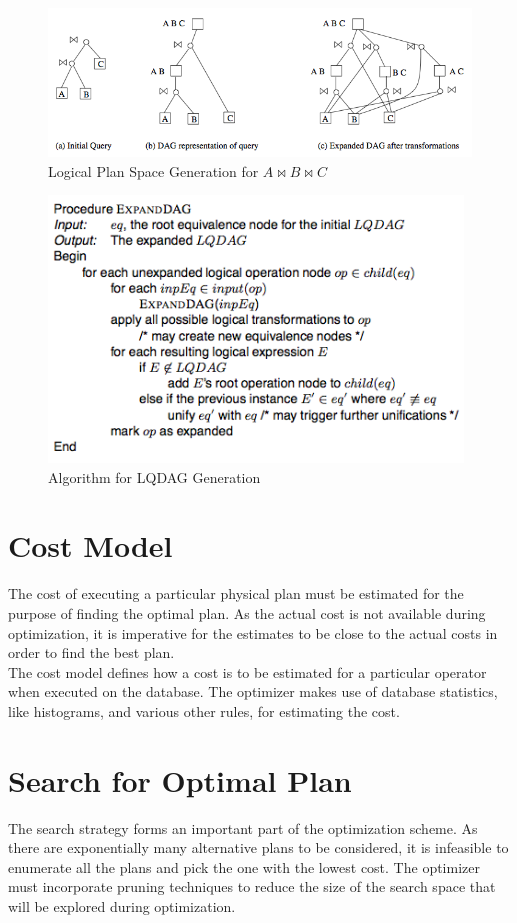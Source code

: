 \begin{figure}[here]
\begin{center}
\includegraphics[width=14cm]{Figures/example_logical.png}
\end{center}
\caption{Logical Plan Space Generation for $A \bowtie B\bowtie C$}
\label{fig:joinabc}
\end{figure}

\begin{figure}[here]
\begin{center}
\includegraphics[width=11cm]{Figures/expandDAG.png}
\end{center}
\caption{Algorithm for LQDAG Generation}
\label{fig:expandDAG}
\end{figure}

\section{Cost Model}
The cost of executing a particular physical plan must be estimated for the purpose of finding the optimal plan. As the actual cost is not available during optimization, it is imperative for the estimates to be close to the actual costs in order to find the best plan. \\

The cost model defines how a cost is to be estimated for a particular operator when executed on the database. The optimizer makes use of database statistics, like histograms, and various other rules, for estimating the cost.

\section{Search for Optimal Plan}
The search strategy forms an important part of the optimization scheme. As there are exponentially many alternative plans to be considered, it is infeasible to enumerate all the plans and pick the one with the lowest cost. The optimizer must incorporate pruning techniques to reduce the size of the search space that will be explored during optimization.
